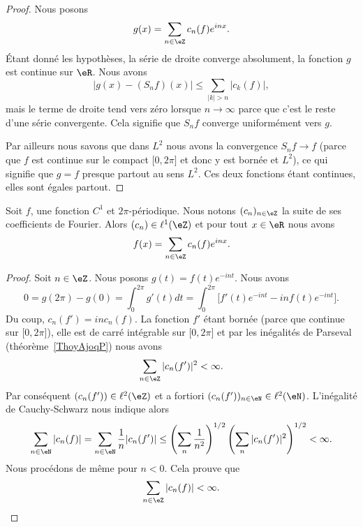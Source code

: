 \begin{proof}
    Nous posons
    \begin{equation}
        g(x)=\sum_{n\in \eZ}c_n(f) e^{inx}.
    \end{equation}
    Étant donné les hypothèses, la série de droite converge absolument, la fonction \( g\) est continue sur \( \eR\). Nous avons
    \begin{equation}
        \big| g(x)-(S_nf)(x) \big|\leq \sum_{| k |> n}| c_k(f) |,
    \end{equation}
    mais le terme de droite tend vers zéro lorsque \( n\to \infty\) parce que c'est le reste d'une série convergente. Cela signifie que \( S_nf\) converge uniformément vers \( g\).

    Par ailleurs nous savons que dans \( L^2\) nous avons la convergence \( S_nf\to f\) (parce que \( f\) est continue sur le compact \( \mathopen[ 0 , 2\pi \mathclose]\) et donc y est bornée et \( L^2\)), ce qui signifie que \( g=f\) presque partout au sens \( L^2\). Ces deux fonctions étant continues, elles sont égales partout.
\end{proof}

\begin{theorem}     \label{ThozHXraQ}
    Soit \( f\), une fonction \( C^1\) et \( 2\pi\)-périodique. Nous notons \( (c_n)_{n\in \eZ}\) la suite de ses coefficients de Fourier. Alors \( (c_n)\in \ell^1(\eZ)\) et pour tout \( x\in \eR\) nous avons
    \begin{equation}
        f(x)=\sum_{n\in \eZ}c_n(f) e^{inx}.
    \end{equation}
\end{theorem}

\begin{proof}
    Soit \( n\in \eZ\). Nous posons \( g(t)=f(t) e^{-int}\). Nous avons
    \begin{equation}
        0=g(2\pi)-g(0)=\int_0^{2\pi}g'(t)dt=\int_0^{2\pi}\big[ f'(t) e^{-int}-inf(t) e^{-int} \big].
    \end{equation}
    Du coup, \( c_n(f')=inc_n(f)\). La fonction \( f'\) étant bornée (parce que continue sur \( \mathopen[ 0 , 2\pi \mathclose]\)), elle est de carré intégrable sur \( \mathopen[ 0 , 2\pi \mathclose]\) et par les inégalités de Parseval (théorème~\ref{ThoyAjoqP}) nous avons
    \begin{equation}
        \sum_{n\in \eZ}| c_n(f') |^2<\infty.
    \end{equation}
    Par conséquent \( (c_n(f'))\in \ell^2(\eZ)\) et a fortiori \( (c_n(f'))_{n\in \eN}\in \ell^2(\eN)\). L'inégalité de Cauchy-Schwarz nous indique alors
    \begin{equation}
        \sum_{n\in \eN}| c_n(f) |=\sum_{n\in \eN}\frac{1}{ n }| c_n(f') |\leq \left( \sum_n\frac{1}{ n^2 } \right)^{1/2}\left( \sum_{n}| c_n(f') |^2 \right)^{1/2}<\infty.
    \end{equation}
    Nous procédons de même pour \( n<0\). Cela prouve que
    \begin{equation}
        \sum_{n\in \eZ}| c_n(f) |<\infty.
    \end{equation}
\end{proof}

